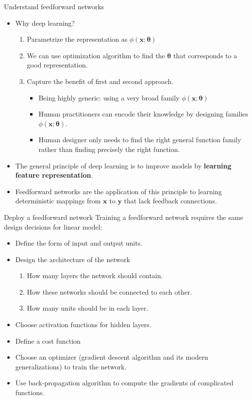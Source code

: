 \documentclass[10pt]{beamer}
\begin{document}
	\begin{frame}{Understand feedforward networks}
		\begin{itemize}
			\item Why deep learning?
			\begin{enumerate}
				\pause
				\item Parametrize the representation as $\phi(\bm{x};\bm{\theta})$
				\pause
				\item We can use optimization algorithm to find the $\bm{\theta}$ that corresponds to a good representation.
				\pause
				\item Capture the benefit of first and second approach.
				\begin{itemize}
					\item Being highly generic: using a very broad family $\phi(\bm{x};\bm{\theta})$
					\item Human practitioners can encode their knowledge by designing families $\phi(\bm{x};\bm{\theta})$.
					\item Human designer only needs to find the right general function family rather than finding precisely the right function.
				\end{itemize}
			\end{enumerate}
			\pause
			\item The general principle of deep learning is to improve models by \textbf{learning feature representation}.
			\pause
			\item Feedforward networks are the application of this principle to learning deterministic mappings from $\bm{x}$ to $\bm{y}$ that lack feedback connections.
		\end{itemize}
	\end{frame}
	
	\begin{frame}{Deploy a feedforward network}
		Training a feedforward network requires the same design decisions for linear model:
		\begin{itemize}
			\pause
			\item Define the form of input and output units.
			\pause
			\item Design the architecture of the network
			\begin{enumerate}
				\pause
				\item How many layers the network should contain.
				\pause
				\item How these networks should be connected to each other.
				\pause
				\item How many units should be in each layer.
			\end{enumerate}
			\pause
			\item Choose activation functions for hidden layers.
			\pause
			\item Define a cost function
			\pause
			\item Choose an optimizer (gradient descent algorithm and its modern generalizations) to train the network.
			\pause
			\item Use back-propagation algorithm to compute the gradients of complicated functions.
		\end{itemize}
	\end{frame}
\end{document}
